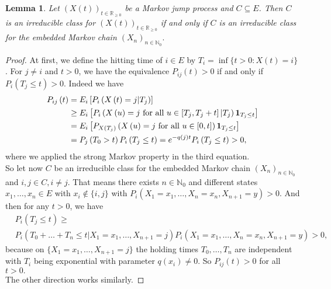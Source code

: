 \documentclass[12pt,a4paper]{scrartcl}
\newtheorem{lemma}[theorem]{Lemma}
\numberwithin{equation}{section}
\newcommand{\R}{\mathbb{R}} %
\newcommand{\N}{\mathbb{N}} %
\begin{document}
\begin{lemma}
\label{smalllemma}
Let $\left(X\left(t\right)\right)_{t \in \R_{\geq 0}} $ be a Markov jump process and $ C \subseteq E $. Then $C$ is an irreducible class for $ \left(X\left(t\right)\right)_{t \in \R_{\geq 0}} $ if and only if $C$ is an irreducible class for the embedded Markov chain $ \left(X_n\right)_{n \in \N_0}.$
\end{lemma}
\begin{proof}
At first, we define the hitting time of $i \in E$ by $T_i = \inf\lbrace t > 0: X\left(t\right) = i \rbrace$. For $j \neq i$ and $ t > 0$, we have the equivalence $P_{ij}\left(t\right) > 0$ if and only if $P_i\left(T_j \leq t\right) > 0.$ Indeed we have
\begin{align*}
P_{ij}\left(t\right) &= E_i \left[ P_i\left(X\left(t\right) = j | T_j \right) \right] \\
&\geq E_i\left[ P_i\left(X\left(u\right) = j \textnormal{ for all } u \in \left[T_j, T_j +t \right]  | T_j \right) \textbf{1}_{T_j \leq t} \right] \\
&= E_i\left[ P_{X\left(T_j\right)}\left(X\left(u\right) = j \textnormal{ for all } u \in \left[0,t\right] \right) \textbf{1}_{T_j \leq t}\right] \\
&= P_j\left(T_0 > t \right) P_i\left(T_j \leq t\right) = e^{-q\left(j\right) t} P_i\left(T_j \leq t\right) > 0,
\end{align*}
where we applied the strong Markov property in the third equation.\\[2ex]
So let now $C$ be an irreducible class for the embedded Markov chain $\left(X_n\right)_{n \in \N_0}$ and $i,j \in C, i \neq j$. That means there exists $n \in \N_0$ and different states $x_1, \ldots , x_n \in E $ with $x_i \notin \lbrace i,j \rbrace$ with $P_i\left(X_1 = x_1, \ldots , X_n = x_n, X_{n+1} = y \right) > 0.$ And then for any $t > 0$, we have 
\begin{align*}
&P_i\left(T_j \leq t\right) \geq \\
&P_i\left(T_0 + \ldots + T_n \leq t | X_1 = x_1, \ldots , X_{n+1} = j\right) P_i\left(X_1 = x_1, \ldots , X_n = x_n, X_{n+1} = y \right) > 0,
\end{align*}
because on $\lbrace X_1 = x_1, \ldots , X_{n+1} = j \rbrace$  the holding times $T_0, \ldots, T_n$ are independent with $T_i$ being exponential with parameter $q\left(x_i\right) \neq 0.$ So $P_{ij}\left(t\right) > 0$ for all $ t > 0.$ \\
The other direction works similarly.
\end{proof}
\end{document}
